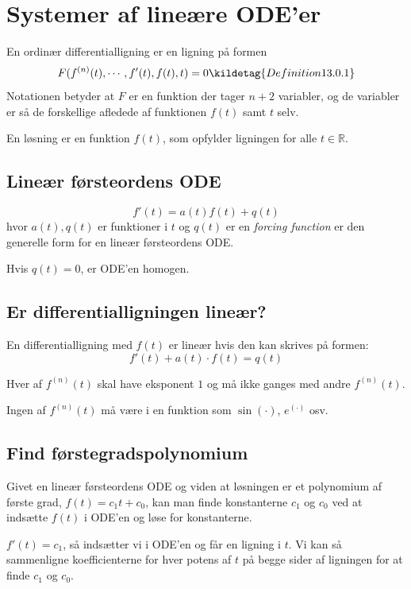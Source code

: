 \section{Systemer af lineære ODE'er}
En ordinær differentialligning er en ligning på formen
\[
F(f^{(n)}(t), \cdots, f'(t), f(t), t) = 0 \kildetag{Definition 13.0.1}
\]
Notationen betyder at $F$ er en funktion der tager $n+2$ variabler, og de variabler er så de forskellige afledede af funktionen $f(t)$ samt $t$ selv.

En løsning er en funktion $f(t)$, som opfylder ligningen for alle $t \in \mathbb{R}$.

\subsection{Lineær førsteordens ODE}

\[
f'(t) = a(t) f(t) + q(t)
\]
hvor $a(t), q(t)$ er funktioner i $t$ og $q(t)$ er en \emph{forcing function} er den generelle form for en lineær førsteordens ODE.

Hvis $q(t) = 0$, er ODE'en homogen.

\subsection{Er differentialligningen lineær?}
\label{sec:diff.lineær}
En differentialligning med $f(t)$ er lineær hvis den kan skrives på formen:
\[
f'(t) + a(t) \cdot f(t) = q(t)
\]

Hver af $f^{(n)}(t)$ skal have eksponent $1$ og må ikke ganges med andre $f^{(n)}(t)$.

Ingen af $f^{(n)}(t)$ må være i en funktion som $\sin(\cdot)$, $e^{(\cdot)}$ osv.

\subsection{Find førstegradspolynomium}
Givet en lineær førsteordens ODE og viden at løsningen er et polynomium af første grad, $f(t) = c_1 t + c_0$, kan man finde konstanterne $c_1$ og $c_0$ ved at indsætte $f(t)$ i ODE'en og løse for konstanterne.

$f'(t) = c_1$, så indsætter vi i ODE'en og får en ligning i $t$. Vi kan så sammenligne koefficienterne for hver potens af $t$ på begge sider af ligningen for at finde $c_1$ og $c_0$.

